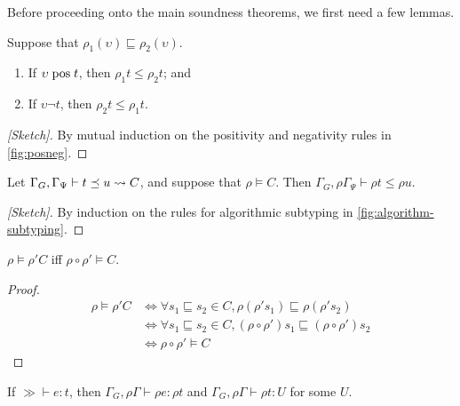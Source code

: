 Before proceeding onto the main soundness theorems, we first need a few lemmas.

\begin{lemma}\label{lem:posneg}
Suppose that $\rho_1(\upsilon) \sqsubseteq \rho_2(\upsilon)$.
\begin{enumerate}
  \item If $\upsilon \mathrel{\text{pos}} t$, then $\rho_1 t \leq \rho_2 t$; and
  \item If $\upsilon \neg t$, then $\rho_2 t \leq \rho_1 t$.
\end{enumerate}
\end{lemma}

\begin{proof}[{[Sketch]}]
By mutual induction on the positivity and negativity rules in \autoref{fig:posneg}.
\end{proof}

\begin{lemma}\label{lem:subtyping}
Let $\Gamma_G, \Gamma_{\Psi} \vdash t \preceq u \rightsquigarrow C$,
and suppose that $\rho \vDash C$.
Then $\Gamma_G, \rho \Gamma_{\Psi} \vdash \rho t \leq \rho u$.
\end{lemma}

\begin{proof}[{[Sketch]}]
By induction on the rules for algorithmic subtyping in \autoref{fig:algorithm-subtyping}.
\end{proof}


\begin{lemma}\label{lem:constraint-subst}
$\rho \vDash \rho' C$ iff $\rho \circ \rho' \vDash C$.
\end{lemma}

\begin{proof}
\begin{align*}
  \rho \vDash \rho' C
  &\Leftrightarrow \forall s_1 \sqsubseteq s_2 \in C, \rho (\rho' s_1) \sqsubseteq \rho (\rho' s_2) \\
  &\Leftrightarrow \forall s_1 \sqsubseteq s_2 \in C, (\rho \circ \rho') s_1 \sqsubseteq (\rho \circ \rho') s_2 \\
  &\Leftrightarrow \rho \circ \rho' \vDash C
\end{align*}
\end{proof}

\begin{lemma}\label{lem:typing-subst}
  If $\gg \vdash e : t$, then $\Gamma_G, \rho \Gamma \vdash \rho e : \rho t$ and $\Gamma_G, \rho \Gamma \vdash \rho t : U$ for some $U$.
\end{lemma}

